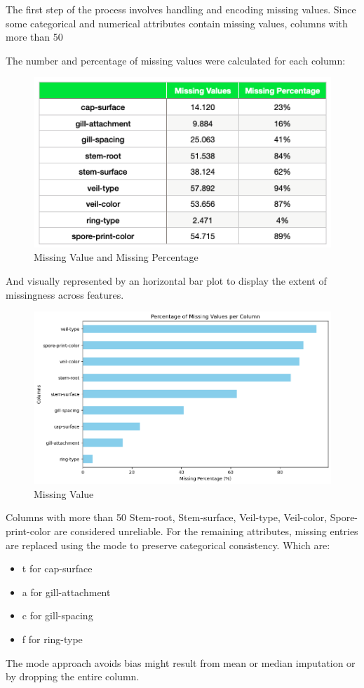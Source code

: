 \documentclass{article}
\begin{document}
The first step of the process involves handling and encoding missing values. Since some categorical and numerical attributes contain missing values, columns with more than 50%

The number and percentage of missing values were calculated for each column:

\begin{figure}[H]
\centering
\includegraphics[width=0.7\linewidth]{MissingValue01.png}
\caption{\label{fig:frog}Missing Value and Missing Percentage}
\end{figure}

And visually represented by an horizontal bar plot to display the extent of missingness across features.

\begin{figure}[H]
\centering
\includegraphics[width=0.7\linewidth]{MissingValue.png}
\caption{\label{fig:frog}Missing Value}
\end{figure}

Columns with more than 50%
Stem-root, Stem-surface, Veil-type, Veil-color, Spore-print-color are considered unreliable.
For the remaining attributes, missing entries are replaced using the mode to preserve categorical consistency. Which are:
\begin{itemize}
    \item t for cap-surface
    \item a for gill-attachment
    \item c for gill-spacing
    \item f for ring-type
\end{itemize}
The mode approach avoids bias might result from mean or median imputation or by dropping the entire column. 
\end{document}
